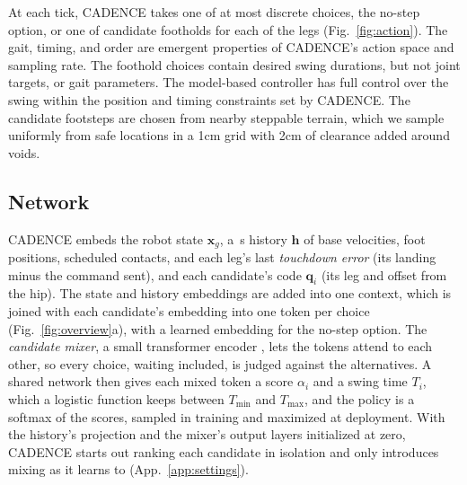  At each tick, CADENCE takes one of at most
\corlTotalCandidates{} discrete choices, the no-step option, or one of
\corlTrainCandidatesPerLeg{} candidate footholds for each of the
\corlNumLegs{} legs (Fig.~\ref{fig:action}). 
The gait, timing, and order are emergent properties of CADENCE's action
space and sampling rate. The foothold choices contain desired
swing durations, but not joint targets, or gait parameters. The
model-based controller has full control over the swing within the position
and timing constraints set by CADENCE.
The candidate footsteps are chosen from nearby steppable terrain, which we
sample uniformly from safe locations in a 1cm grid with 2cm of clearance added around voids.


\subsection{Network}
\label{subsec:method-network}

 CADENCE embeds the robot state $\mathbf x_g$, a
\corlHistSeconds\,s history $\mathbf h$ of base velocities, foot
positions, scheduled contacts, and each leg's last \emph{touchdown
error} (its landing minus the command sent), and each candidate's code
$\mathbf q_i$ (its leg and offset from the hip). The state and history
embeddings are added into one context, which is joined with each
candidate's embedding into one token per choice
(Fig.~\ref{fig:overview}a), with a learned embedding for the no-step
option. The \emph{candidate mixer}, a small transformer encoder
\citep{vaswani_attention_2017}, lets the tokens attend to each other, so
every choice, waiting included, is judged against the alternatives. A
shared network then gives each mixed token a score $\alpha_i$ and a
swing time $T_i$, which a logistic function keeps between $T_{\min}$ and
$T_{\max}$, and the policy is a softmax of the scores, sampled in
training and maximized at deployment. With the history's projection and
the mixer's output layers initialized at zero, CADENCE starts out
ranking each candidate in isolation and only introduces mixing as it
learns to (App.~\ref{app:settings}).


